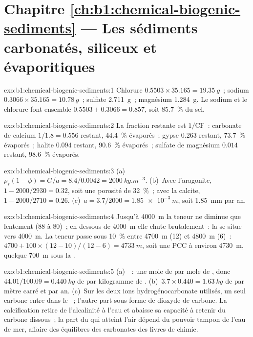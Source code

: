 \section*{Chapitre \ref{ch:b1:chemical-biogenic-sediments} --- Les sédiments carbonatés, siliceux et évaporitiques}

\begin{solution}{exo:b1:chemical-biogenic-sediments:1}
Chlorure $0.5503\times35.165 = \qty{19.35}{g}$~; sodium $0.3066\times35.165 =
\qty{10.78}{g}$~; sulfate \qty{2.711}{g}~; magnésium \qty{1.284}{g}. Le sodium et le
chlorure font ensemble $0.5503 + 0.3066 = 0.857$, soit \qty{85.7}{\%} du
sel.
\end{solution}

\begin{solution}{exo:b1:chemical-biogenic-sediments:2}
La fraction restante est $1/\mathrm{CF}$~: carbonate de calcium $1/1.8 = 0.556$ restant,
\qty{44.4}{\%} évaporés~; gypse $0.263$ restant, \qty{73.7}{\%} évaporés~;
halite $0.094$ restant, \qty{90.6}{\%} évaporés~; sulfate de magnésium $0.014$ restant,
\qty{98.6}{\%} évaporés.
\end{solution}

\begin{solution}{exo:b1:chemical-biogenic-sediments:3}
(a)~$\rho_s(1-\phi) = G/a = 8.4/0.0042 = \qty{2000}{kg.m^{-3}}$. (b)~Avec
l'aragonite, $1 - 2000/2930 = 0.32$, soit une porosité de \qty{32}{\%}~; avec la calcite,
$1 - 2000/2710 = 0.26$. (c)~$a = 3.7/2000 = \qty{1.85e-3}{m}$, soit \qty{1.85}{mm} par
an.
\end{solution}

\begin{solution}{exo:b1:chemical-biogenic-sediments:4}
Jusqu'à \qty{4000}{m} la teneur ne diminue que lentement (88 à 80)~; en dessous de
\qty{4000}{m} elle chute brutalement~: la  se situe vers \qty{4000}{m}. La
teneur passe sous \qty{10}{\%} entre \qty{4700}{m} (12) et \qty{4800}{m}
(6)~: $4700 + 100\times(12-10)/(12-6) = \qty{4733}{m}$, soit une PCC à environ
\qty{4730}{m}, quelque \qty{700}{m} sous la .
\end{solution}

\begin{solution}{exo:b1:chemical-biogenic-sediments:5}
(a)~~: une mole de  par mole de
, donc $44.01/100.09 = \qty{0.440}{kg}$ de  par kilogramme de
. (b)~$3.7\times0.440 = \qty{1.63}{kg}$ de  par mètre carré et
par an. (c)~Sur les deux ions hydrogénocarbonate utilisés, un seul carbone entre dans
le ~; l'autre part sous forme de dioxyde de carbone. La calcification retire de l'alcalinité
à l'eau et abaisse sa capacité à retenir du carbone dissous~; la part du
 qui atteint l'air dépend du pouvoir tampon de l'eau de mer, affaire des
équilibres des carbonates des livres de chimie.
\end{solution}

